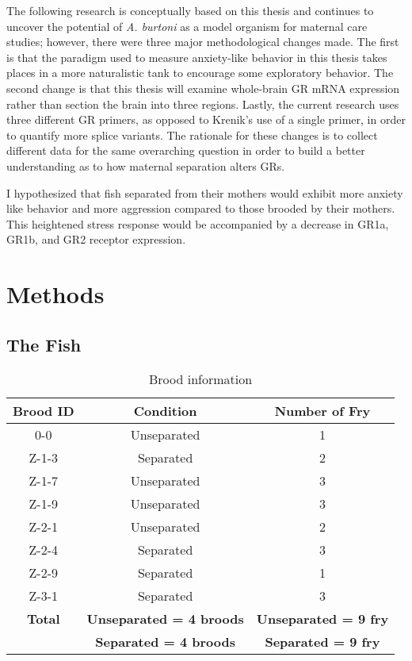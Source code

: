 \documentclass[12pt,twoside]{reedthesis}
\begin{document}
The following research is
conceptually based on this thesis and continues to uncover the potential of
\textit{A. burtoni} as a model organism for maternal care studies; however, there were
three major methodological changes made. The
first is that the paradigm used to measure anxiety-like behavior in this thesis takes places in
a more naturalistic tank to encourage some exploratory behavior. The second change is that this thesis will examine
whole-brain GR mRNA expression rather than section the brain into three regions.
Lastly,
the current research uses three different GR primers, as opposed to Krenik's use
of a single primer, in order to quantify
more splice variants. The rationale for these changes is to collect different
data for the same overarching question in order to build a better understanding
as to how
maternal separation alters GRs.

I hypothesized that fish separated from their mothers would exhibit more anxiety
like behavior and more aggression compared to those brooded by their mothers.
This heightened stress response would be accompanied by a decrease in GR1a,
GR1b, and GR2 receptor expression.

\chapter{Methods}
\section{The Fish}
\begin{table}[htbp]
\caption[Brood information]{Brood information}
\begin{center}
\footnotesize
\begin{tabular}{ | c | c | c |}
\hline
\textbf{Brood ID} & \textbf{Condition} & \textbf{Number of Fry}\\
\hline
0-0 & Unseparated & 1\\
\hline
Z-1-3 & Separated & 2\\
  \hline
  Z-1-7 & Unseparated & 3\\
  \hline
Z-1-9 & Unseparated & 3\\
\hline
Z-2-1 & Unseparated & 2 \\
  \hline
Z-2-4 & Separated & 3 \\
\hline
Z-2-9 & Separated & 1 \\
\hline
Z-3-1 & Separated & 3 \\
  \hline
  \textbf{Total} & \textbf{Unseparated = 4 broods} & \textbf{Unseparated = 9 fry}\\
  & \textbf{Separated = 4 broods} & \textbf{Separated = 9 fry}\\
  \hline
\end{tabular}
\end{center}
\end{table}
\end{document}
